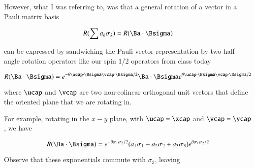 %
%
%
%

However, what I was referring to, was that a general rotation of a vector in a Pauli matrix basis

\begin{equation}\label{eqn:qmTwoL15:5000}
R(\sum a_k \sigma_k) = R( \Ba \cdot \Bsigma)
\end{equation}

can be expressed by sandwiching the Pauli vector representation by two half angle rotation operators like our spin 1/2 operators from class today

\begin{equation}\label{eqn:qmTwoL15:5020}
R( \Ba \cdot \Bsigma) = e^{-\theta \ucap \cdot \Bsigma \vcap \cdot \Bsigma/2} \Ba \cdot \Bsigma e^{\theta \ucap \cdot \Bsigma \vcap \cdot \Bsigma/2}
\end{equation}

where $\ucap$ and $\vcap$ are two non-colinear orthogonal unit vectors that define the oriented plane that we are rotating in.

For example, rotating in the $x-y$ plane, with $\ucap = \xcap$ and $\vcap = \ycap$, we have

\begin{equation}\label{eqn:qmTwoL15:5040}
R( \Ba \cdot \Bsigma) 
= e^{-\theta \sigma_1 \sigma_2/2} (a_1 \sigma_1 + a_2 \sigma_2 + a_3 \sigma_3) e^{\theta \sigma_1 \sigma_2/2} 
\end{equation}

Observe that these exponentials commute with $\sigma_3$, leaving

